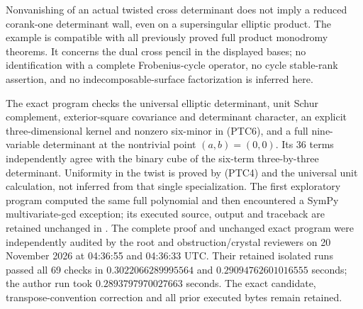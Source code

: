 \begin{remark}
\label{rem:ss-product-one-axis-cross-cube-scope}
Nonvanishing of an actual twisted cross determinant does not imply
a reduced corank-one determinant wall, even on a supersingular
elliptic product. The example is compatible with all previously
proved full product monodromy theorems. It concerns the dual cross
pencil in the displayed bases; no identification with a complete
Frobenius-cycle operator, no cycle stable-rank assertion, and no
indecomposable-surface factorization is inferred here.

The exact program
checks the universal elliptic determinant, unit Schur complement,
exterior-square covariance and determinant character, an explicit
three-dimensional kernel and nonzero six-minor in (PTC6), and a
full nine-variable determinant at the nontrivial point \((a,b)=(0,0)\).
Its 36 terms independently agree with the binary cube of the
six-term three-by-three determinant. Uniformity in the twist is
proved by (PTC4) and the universal unit calculation, not inferred
from that single specialization. The first exploratory program
computed the same full polynomial and then encountered a SymPy
multivariate-gcd exception; its executed source, output and traceback
are retained unchanged in
.
The complete proof and unchanged exact program were independently
audited by the root and obstruction/crystal reviewers on
20 November 2026 at 04:36:55 and 04:36:33 UTC. Their retained
isolated runs passed all 69 checks in
\(0.3022066289995564\) and \(0.29094762601016555\) seconds;
the author run took \(0.2893797970027663\) seconds. The exact
candidate, transpose-convention correction and all prior executed
bytes remain retained.
\end{remark}
